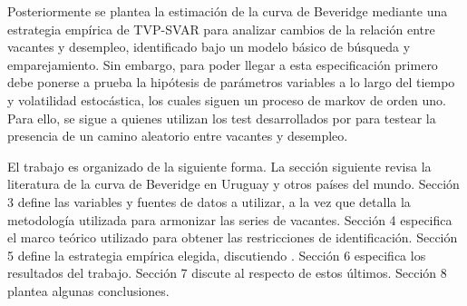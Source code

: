 Posteriormente se plantea la estimación de la curva de Beveridge mediante una estrategia empírica de TVP-SVAR para analizar cambios de la relación entre vacantes y desempleo, identificado bajo un modelo básico de búsqueda y emparejamiento. Sin embargo, para poder llegar a esta especificación primero debe ponerse a prueba la hipótesis de parámetros variables a lo largo del tiempo y volatilidad estocástica, los cuales siguen un proceso de markov de orden uno. Para ello, se sigue a \cite{Benati2013} quienes utilizan los test desarrollados por \cite{Stock1996, Stock1998} para testear la presencia de un camino aleatorio entre vacantes y desempleo.

El trabajo es organizado de la siguiente forma. La sección siguiente revisa la literatura de la curva de Beveridge en Uruguay y otros países del mundo. Sección 3 define las variables y fuentes de datos a utilizar, a la vez que detalla la metodología utilizada para armonizar las series de vacantes. Sección 4 especifica el marco teórico utilizado para obtener las restricciones de identificación. Sección 5 define la estrategia empírica elegida, discutiendo . Sección 6 especifica los resultados del trabajo. Sección 7 discute al respecto de estos últimos. Sección 8 plantea algunas conclusiones.